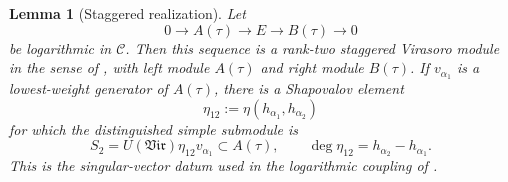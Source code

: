 \documentclass[12pt,leqno]{amsart}
\numberwithin{equation}{section}
\newtheorem{lem}[thm]{Lemma}
\newcommand{\Vir}{\mathfrak{Vir}}
\begin{document}
\begin{lem}[Staggered realization]
\label{lem:local-staggered-realization}
Let
\[
 0\longrightarrow A(\tau)\longrightarrow E\longrightarrow
 B(\tau)\longrightarrow0
\]
be logarithmic in $\mathscr C$.  Then this sequence is a rank-two
staggered Virasoro module in the sense of
\cite[Section~3]{KytolaRidout}, with left module $A(\tau)$ and right
module $B(\tau)$.  If $v_{\alpha_1}$ is a lowest-weight generator of
$A(\tau)$, there is a Shapovalov element
\[
 \eta_{12}:=\eta(h_{\alpha_1},h_{\alpha_2})
\]
for which the distinguished simple submodule is
\[
 S_2=U(\Vir)\eta_{12}v_{\alpha_1}\subset A(\tau),
 \qquad
 \deg\eta_{12}=h_{\alpha_2}-h_{\alpha_1}.
\]
This is the singular-vector datum used in the logarithmic coupling of
\cite[Theorem~5.11]{Nakano}.
\end{lem}
\end{document}
